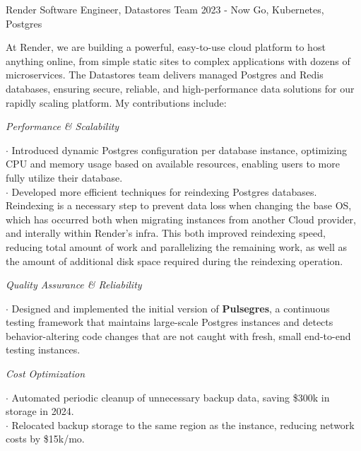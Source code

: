 \documentclass[]{clean-resume}
\begin{document}
\detailentry
  {Render}
  {Software Engineer, Datastores Team}
  {2023 - Now}
  {Go, Kubernetes, Postgres}
  {
    At Render, we are building a powerful, easy-to-use cloud platform to host anything online, from simple static sites to complex applications with dozens of microservices. The Datastores team delivers managed Postgres and Redis databases, ensuring secure, reliable, and high-performance data solutions for our rapidly scaling platform. My contributions include:

    \textit{Performance \& Scalability}
    \begin{addmargin}[1em]{0em}
      \phantom{~~}\hspace{-1em}$\cdot$ Introduced dynamic Postgres configuration per database instance, optimizing CPU and memory usage based on available resources, enabling users to more fully utilize their database. \\
      \phantom{~~}\hspace{-1em}$\cdot$ Developed more efficient techniques for reindexing Postgres databases. Reindexing is a necessary step to prevent data loss when changing the base OS, which has occurred both when migrating instances from another Cloud provider, and interally within Render's infra. This both improved reindexing speed, reducing total amount of work and parallelizing the remaining work, as well as the amount of additional disk space required during the reindexing operation.
    \end{addmargin}

    \textit{Quality Assurance \& Reliability}
    \begin{addmargin}[1em]{0em}
      \phantom{~~}\hspace{-1em}$\cdot$ Designed and implemented the initial version of \textbf{Pulsegres}, a continuous testing framework that maintains large-scale Postgres instances and detects behavior-altering code changes that are not caught with fresh, small end-to-end testing instances.
    \end{addmargin}

    \textit{Cost Optimization}
    \begin{addmargin}[1em]{0em}
      \phantom{~~}\hspace{-1em}$\cdot$ Automated periodic cleanup of unnecessary backup data, saving \$300k in storage in 2024. \\
      \phantom{~~}\hspace{-1em}$\cdot$ Relocated backup storage to the same region as the instance, reducing network costs by \$15k/mo.
    \end{addmargin}

}
\end{document}
